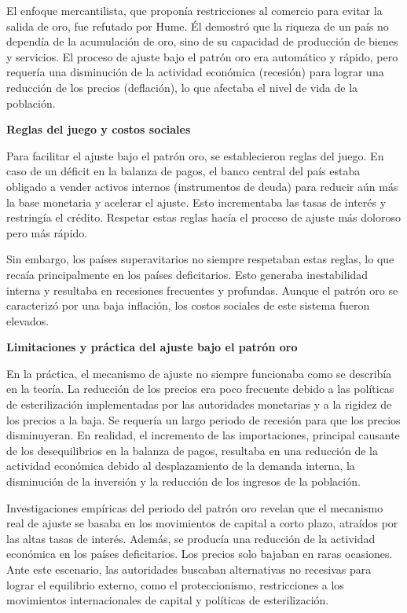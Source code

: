 \documentclass[
  jou,
  floatsintext,
  longtable,
  a4paper,
  nolmodern,
  notxfonts,
  notimes,
  12pt,
  colorlinks=true,linkcolor=blue,citecolor=blue,urlcolor=blue]{apa7}
\begin{document}
El enfoque mercantilista, que proponía restricciones al comercio para
evitar la salida de oro, fue refutado por Hume. Él demostró que la
riqueza de un país no dependía de la acumulación de oro, sino de su
capacidad de producción de bienes y servicios. El proceso de ajuste bajo
el patrón oro era automático y rápido, pero requería una disminución de
la actividad económica (recesión) para lograr una reducción de los
precios (deflación), lo que afectaba el nivel de vida de la población.

\textbf{Reglas del juego y costos sociales}

Para facilitar el ajuste bajo el patrón oro, se establecieron reglas del
juego. En caso de un déficit en la balanza de pagos, el banco central
del país estaba obligado a vender activos internos (instrumentos de
deuda) para reducir aún más la base monetaria y acelerar el ajuste. Esto
incrementaba las tasas de interés y restringía el crédito. Respetar
estas reglas hacía el proceso de ajuste más doloroso pero más rápido.

Sin embargo, los países superavitarios no siempre respetaban estas
reglas, lo que recaía principalmente en los países deficitarios. Esto
generaba inestabilidad interna y resultaba en recesiones frecuentes y
profundas. Aunque el patrón oro se caracterizó por una baja inflación,
los costos sociales de este sistema fueron elevados.

\textbf{Limitaciones y práctica del ajuste bajo el patrón oro}

En la práctica, el mecanismo de ajuste no siempre funcionaba como se
describía en la teoría. La reducción de los precios era poco frecuente
debido a las políticas de esterilización implementadas por las
autoridades monetarias y a la rigidez de los precios a la baja. Se
requería un largo periodo de recesión para que los precios disminuyeran.
En realidad, el incremento de las importaciones, principal causante de
los desequilibrios en la balanza de pagos, resultaba en una reducción de
la actividad económica debido al desplazamiento de la demanda interna,
la disminución de la inversión y la reducción de los ingresos de la
población.

Investigaciones empíricas del periodo del patrón oro revelan que el
mecanismo real de ajuste se basaba en los movimientos de capital a corto
plazo, atraídos por las altas tasas de interés. Además, se producía una
reducción de la actividad económica en los países deficitarios. Los
precios solo bajaban en raras ocasiones. Ante este escenario, las
autoridades buscaban alternativas no recesivas para lograr el equilibrio
externo, como el proteccionismo, restricciones a los movimientos
internacionales de capital y políticas de esterilización.
\end{document}

